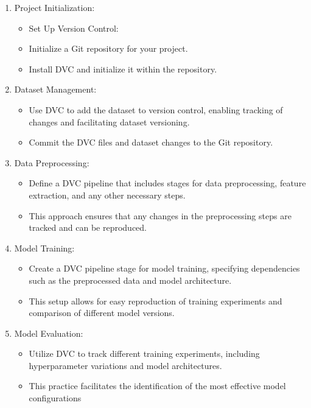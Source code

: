 \begin{enumerate}
  \item Project Initialization:
    \begin{itemize}
	  \item Set Up Version Control:
	  \item Initialize a Git repository for your project.
	  \item Install DVC and initialize it within the repository.
	\end{itemize}

  \item Dataset Management:
	\begin{itemize}
		\item Use DVC to add the dataset to version control, enabling tracking of changes and facilitating dataset versioning.
		\item Commit the DVC files and dataset changes to the Git repository.
	\end{itemize}

  \item Data Preprocessing:
	\begin{itemize}
		\item 	Define a DVC pipeline that includes stages for data preprocessing, feature extraction, and any other necessary steps.
		\item This approach ensures that any changes in the preprocessing steps are tracked and can be reproduced.
	\end{itemize}

	
  \item Model Training:
    \begin{itemize}
    	\item Create a DVC pipeline stage for model training, specifying dependencies such as the preprocessed data and model architecture.
    	\item This setup allows for easy reproduction of training experiments and comparison of different model versions.
    \end{itemize}

	
	\item Model Evaluation:
	\begin{itemize}
		\item Utilize DVC to track different training experiments, including hyperparameter variations and model architectures.
		\item This practice facilitates the identification of the most effective model configurations
	\end{itemize}


\end{enumerate}
